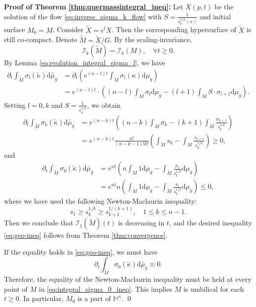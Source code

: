 \documentclass[10pt,a4paper]{amsart}
\newcommand{\dd}{\ensuremath{\text{d}}}
\renewcommand{\H}{{\mathbb{H}}}
\numberwithin{equation}{section}
\begin{document}
\par {\bf Proof of Theorem \ref{thm:quermassintegral_ineq}:} Let \(X(p,t)\) be the solution of the flow \eqref{eq:inverse_sigma_k_flow} with \(S = \frac{1}{s_k^{1/k}(\kappa)}\) and initial surface \(M_0 = M\). Consider \(\widetilde{X} = e^{t}X\). Then the corresponding hypersurface of \(\widetilde{X}\) is still co-compact. Denote \(\widetilde{M} = \widetilde{X} / G\). By the scaling-invariance, 
\[ \mathcal{I}_k(\widetilde{M}) = \mathcal{I}_k(M), \quad \forall t \geq 0. \]
By Lemma \ref{eq:evolution_integral_sigma_l}, we have
\begin{equation}
    \begin{aligned}
        \partial_t \int_{\widetilde{M}} \sigma_l(\widetilde{\kappa}) \dd \widetilde{\mu_g} &= \partial_t \left( e^{(n-l)t}\int_{M} \sigma_l(\kappa) \dd \mu_g \right) \\
        &= e^{(n-l)t}\cdot \left((n-l)\int_M \sigma_l \dd \mu_g - (l+1)\int_{M}S\cdot \sigma_{l+1} \dd \mu_g \right).
    \end{aligned}
\end{equation}
Setting \(l=0,k\) and \(S = \frac{1}{s_k^{1/k}}\), we obtain
\begin{equation}
\begin{aligned}
    \partial_t \int_{\widetilde{M}} \sigma_k(\widetilde{\kappa}) \dd \widetilde{\mu_g} &= e^{(n-k)t}\left( (n-k)\int_{M}\sigma_k - (k+1) \int_{M}\frac{\sigma_{k+1}}{s_k^{1/k}} \right) \\
    &= e^{(n-k)t}\frac{n!}{(n-k-1)!k!}\left( \int_{M}s_k - \int_{M}\frac{s_{k+1}}{s_k^{1/k}} \right) \geq 0,
\end{aligned}
\end{equation}
and 
\begin{equation}\label{eq:integral_sigma_0_ineq}
    \begin{aligned}
        \partial_t \int_{\widetilde{M}} \sigma_0(\widetilde{\kappa}) \dd \widetilde{\mu_g} &= e^{nt}\left( n\int_M 1\dd\mu_g - \int_M \frac{\sigma_1}{s_k^{1/k}}\dd \mu_g \right) \\
        &= e^{nt}n\left( \int_M 1\dd\mu_g  - \int_M \frac{s_1}{s_k^{1/k}}\dd \mu_g \right) \leq 0,
    \end{aligned}
\end{equation}
where we have used the following Newton-Maclaurin inequality:
\[ s_1 \geq s_k^{1/k} \geq s_{k+1}^{1/(k+1)},\quad 1\leq k \leq n-1 . \]
Then we conclude that \(\mathcal{I}_1(\widetilde{M})(t)\) is decreasing in \(t\), and the desired inequality \eqref{eq:geo-ineq} follows from Theorem \ref{thm:convergence}. 
\par If the equality holds in \eqref{eq:geo-ineq}, we must have 
\[ \partial_t \int_{\widetilde{M}} \sigma_0(\widetilde{\kappa}) \dd \widetilde{\mu_g} \equiv 0. \]
Therefore, the equality of the Newton-Maclaurin inequality must be held at every point of \(M\) in \eqref{eq:integral_sigma_0_ineq}. This implies \(M\) is umbilical for each \(t \geq 0\). In particular, \(M_0\) is a part of \(\H^n\). \qed
\end{document}
